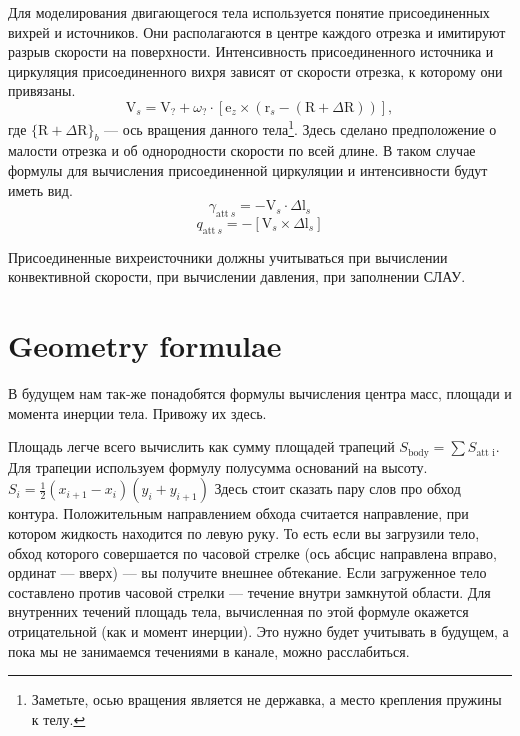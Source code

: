 \documentclass[14pt]{extreport}
\newcommand{\br}[1]{\boldsymbol{\mathrm{#1}}}
\renewcommand{\vec}[1]{\br{#1}}
\newcommand{\att}{\text{att}}
\begin{document}
Для моделирования двигающегося тела используется понятие присоединенных вихрей и источников. Они располагаются в центре каждого отрезка и имитируют разрыв скорости на поверхности. %
Интенсивность присоединенного источника и циркуляция присоединенного вихря зависят от скорости отрезка, к которому они привязаны.
\begin{equation*}
\vec V_s = \vec V_? + \omega_? \cdot [\vec e_z \times (\vec r_s - (\vec R + \Delta \vec R))],
\end{equation*}
где $\lbrace\vec R + \Delta \vec R\rbrace_b$ --- ось вращения данного тела\footnote{Заметьте, осью вращения является не державка, а место крепления пружины к телу.}. Здесь сделано предположение о малости отрезка и об однородности скорости по всей длине. В таком случае формулы для вычисления присоединенной циркуляции и интенсивности будут иметь вид.
\begin{equation*}
\gamma_{\att~s} = -\vec V_s \cdot \Delta \vec l_s
\end{equation*}
\begin{equation*}
q_{\att~s} = -[\vec V_s \times \Delta \vec l_s]
\end{equation*}

Присоединенные вихреисточники должны учитываться при вычислении конвективной скорости, при вычислении давления, при заполнении СЛАУ.

\section{Geometry formulae}
В будущем нам так-же понадобятся формулы вычисления центра масс, площади и момента инерции тела. Привожу их здесь.

Площадь легче всего вычислить как сумму площадей трапеций $S_\text{body} = \sum S_\text{att~i}$. Для трапеции используем формулу полусумма оснований на высоту. $S_i = \frac{1}{2}(x_{i+1}-x_i)(y_i+y_{i+1})$
Здесь стоит сказать пару слов про обход контура. Положительным направлением обхода считается направление, при котором жидкость находится по левую руку. То есть если вы загрузили тело, обход которого совершается по часовой стрелке (ось абсцис направлена вправо, ординат --- вверх) --- вы получите внешнее обтекание. Если загруженное тело составлено против часовой стрелки --- течение внутри замкнутой области. Для внутренних течений площадь тела, вычисленная по этой формуле окажется отрицательной (как и момент инерции). Это нужно будет учитывать в будущем, а пока мы не занимаемся течениями в канале, можно расслабиться.
\end{document}
